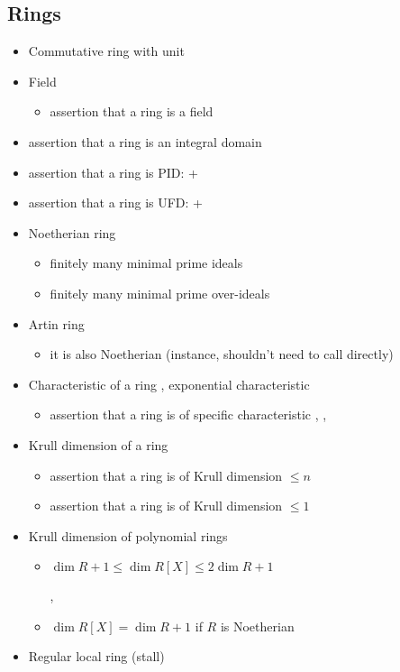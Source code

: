 \subsection{Rings}

\begin{itemize}
\item
Commutative ring with unit 
\item
Field 
\begin{itemize}
\item
assertion that a ring is a field 
\end{itemize}
\item
assertion that a ring is an integral domain 
\item
assertion that a ring is PID:  + 
\item
assertion that a ring is UFD:  + 
\item
Noetherian ring 
\begin{itemize}
\item
finitely many minimal prime ideals
\item
finitely many minimal prime over-ideals
\end{itemize}
\item
Artin ring 
\begin{itemize}
\item
it is also Noetherian 
(instance, shouldn't need to call directly)
\end{itemize}
\item
Characteristic of a ring , exponential characteristic 
\begin{itemize}
\item
assertion that a ring is of specific characteristic
, , 
\end{itemize}
\item
Krull dimension of a ring 
\begin{itemize}
\item
assertion that a ring is of Krull dimension $\leq n$
\item
assertion that a ring is of Krull dimension $\leq 1$
\end{itemize}
\item
Krull dimension of polynomial rings
\begin{itemize}
\item
$\dim R+1\leq\dim R[X]\leq 2\dim R+1$

,
\item
$\dim R[X]=\dim R+1$ if $R$ is Noetherian
\end{itemize}
\item
Regular local ring  (stall)
\end{itemize}

